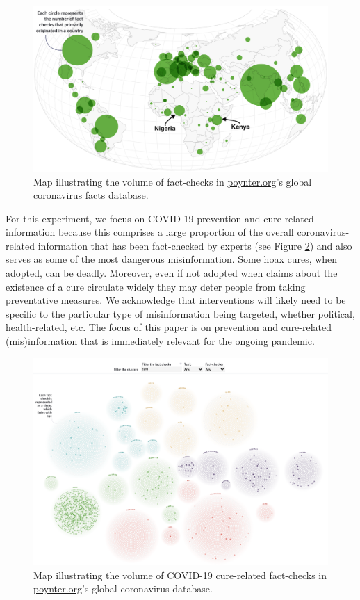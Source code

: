 \documentclass[letterpaper, 12pt, parskip=full,DIV=10]{scrartcl}
\begin{document}
\begin{figure}[!htb]
\centering
\caption{Map illustrating the volume of fact-checks in \url{poynter.org}'s global coronavirus facts database.}
\label{fig:poynter}
\includegraphics[width=.95\textwidth]{figures/poynter2.png}
\end{figure}

For this experiment, we focus on COVID-19 prevention and cure-related information because this comprises a large proportion of the overall coronavirus-related information that has been fact-checked by experts (see Figure \ref{fig:poynter_cures}) and also serves as some of the most dangerous misinformation. Some hoax cures, when adopted, can be deadly. Moreover, even if not adopted when claims about the existence of a cure circulate widely they may deter people from taking preventative measures. We acknowledge that interventions will likely need to be specific to the particular type of misinformation being targeted, whether political, health-related, etc. The focus of this paper is on prevention and cure-related (mis)information that is immediately relevant for the ongoing pandemic. 


\begin{figure}[!htb]
\centering
\caption{Map illustrating the volume of COVID-19 cure-related fact-checks in \url{poynter.org}'s global coronavirus database.}
\label{fig:poynter_cures}
\includegraphics[width=.95\textwidth]{figures/poynter_cures.png} 
\end{figure}
\end{document}
